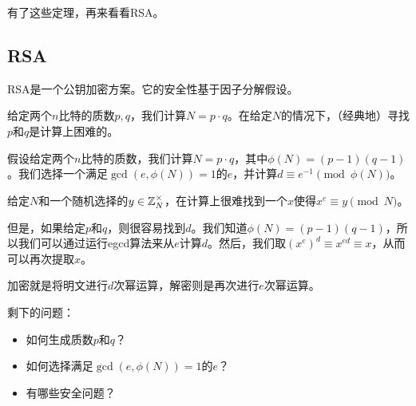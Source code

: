 有了这些定理，再来看看RSA。

\subsection{RSA}
RSA是一个公钥加密方案。它的安全性基于因子分解假设。
\begin{definition}[因子分解假设]
	给定两个$n$比特的质数$p, q$，我们计算$N = p\cdot q$。在给定$N$的情况下，（经典地）寻找$p$和$q$是计算上困难的。
\end{definition}
\begin{definition}
    假设给定两个$n$比特的质数，我们计算$N = p\cdot q$，其中$\phi(N) = (p-1)(q-1)$。我们选择一个满足$\gcd(e, \phi(N)) = 1$的$e$，并计算$d \equiv e^{-1}\pmod{\phi(N)}$。

    给定$N$和一个随机选择的$y\in \mathbb Z_{N}^\times$，在计算上很难找到一个$x$使得$x^e\equiv y\pmod{N}$。

	但是，如果给定$p$和$q$，则很容易找到$d$。我们知道$\phi(N) = (p-1)(q-1)$，所以我们可以通过运行egcd算法来从$e$计算$d$。然后，我们取$(x^e)^d\equiv x^{ed}\equiv x$，从而可以再次提取$x$。

\end{definition}

加密就是将明文进行$d$次幂运算，解密则是再次进行$e$次幂运算。

剩下的问题：
\begin{itemize}
\item 如何生成质数$p$和$q$？
\item 如何选择满足$\gcd(e, \phi(N)) = 1$的$e$？
\item 有哪些安全问题？
\end{itemize}